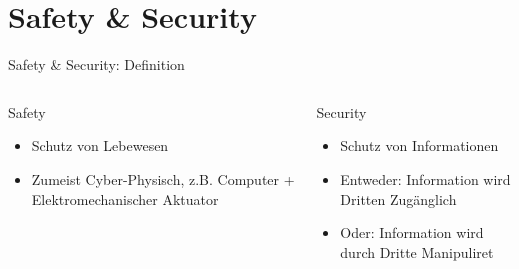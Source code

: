 \section{Safety \& Security}

\begin{frame}[T]{Safety \& Security: Definition}
\small
  \begin{columns}[t,fullwidth]
   \hfill
    \begin{column}{.45\linewidth}
      \begin{block}{Safety}
      \begin{itemize}
        \item Schutz von Lebewesen
        \item Zumeist Cyber-Physisch, z.B. Computer + Elektromechanischer Aktuator
      \end{itemize}
      \end{block}
    \end{column}
    \hfill
    \begin{column}{.45\linewidth}
      \begin{block}{Security}
      \begin{itemize}
        \item Schutz von Informationen
        \item Entweder: Information wird Dritten Zugänglich
        \item Oder: Information wird durch Dritte Manipuliret
      \end{itemize}
      \end{block}
    \end{column}
    \hfill
  \end{columns}
\end{frame}

